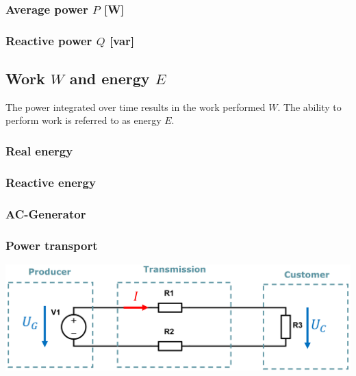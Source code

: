 \documentclass{article}
\begin{document}
\subsubsection{Average power $P$ [W]}

\subsubsection{Reactive power $Q$ [var]}

\subsection{Work $W$ and energy $E$}
The power integrated over time results in the work performed $W$.
The ability to perform work is referred to as energy $E$.

\subsubsection{Real energy}

\subsubsection{Reactive energy}

\subsubsection{AC-Generator}

\newpage
\subsubsection{Power transport}
\begin{center}
    \includegraphics[width=.95\textwidth]{media/power_transport.png}
\end{center}
\end{document}
